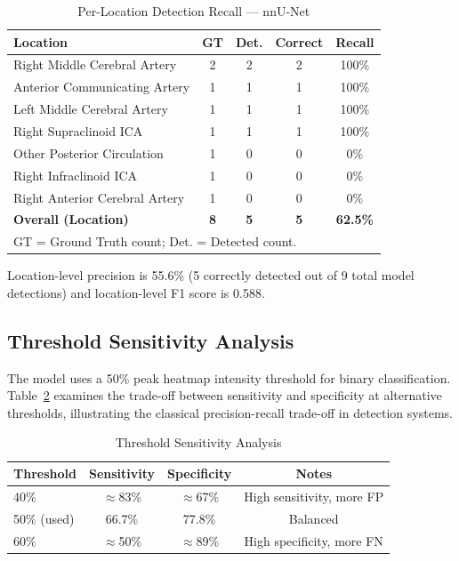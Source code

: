 \documentclass[journal]{IEEEtran}
\begin{document}
\begin{table}[!t]
\renewcommand{\arraystretch}{1.3}
\caption{Per-Location Detection Recall — nnU-Net}
\label{tab:location_results}
\centering
\begin{tabular}{lcccc}
\toprule
\textbf{Location} & \textbf{GT} & \textbf{Det.} & \textbf{Correct} & \textbf{Recall} \\
\midrule
Right Middle Cerebral Artery  & 2 & 2 & 2 & 100\% \\
Anterior Communicating Artery & 1 & 1 & 1 & 100\% \\
Left Middle Cerebral Artery   & 1 & 1 & 1 & 100\% \\
Right Supraclinoid ICA        & 1 & 1 & 1 & 100\% \\
Other Posterior Circulation   & 1 & 0 & 0 &   0\% \\
Right Infraclinoid ICA        & 1 & 0 & 0 &   0\% \\
Right Anterior Cerebral Artery& 1 & 0 & 0 &   0\% \\
\midrule
\textbf{Overall (Location)}   & \textbf{8} & \textbf{5} & \textbf{5} & \textbf{62.5\%} \\
\bottomrule
\multicolumn{5}{l}{\footnotesize GT = Ground Truth count; Det. = Detected count.} \\
\end{tabular}
\end{table}

Location-level precision is 55.6\% (5 correctly detected out of 9 total
model detections) and location-level F1 score is 0.588.

\subsection{Threshold Sensitivity Analysis}

The model uses a 50\% peak heatmap intensity threshold for binary
classification. Table~\ref{tab:threshold} examines the trade-off between
sensitivity and specificity at alternative thresholds, illustrating the
classical precision-recall trade-off in detection systems.

\begin{table}[!t]
\renewcommand{\arraystretch}{1.3}
\caption{Threshold Sensitivity Analysis}
\label{tab:threshold}
\centering
\begin{tabular}{lccc}
\toprule
\textbf{Threshold} & \textbf{Sensitivity} & \textbf{Specificity} & \textbf{Notes} \\
\midrule
40\% & $\approx$83\% & $\approx$67\% & High sensitivity, more FP \\
50\% (used) & 66.7\% & 77.8\% & Balanced \\
60\% & $\approx$50\% & $\approx$89\% & High specificity, more FN \\
\bottomrule
\end{tabular}
\end{table}
\end{document}
